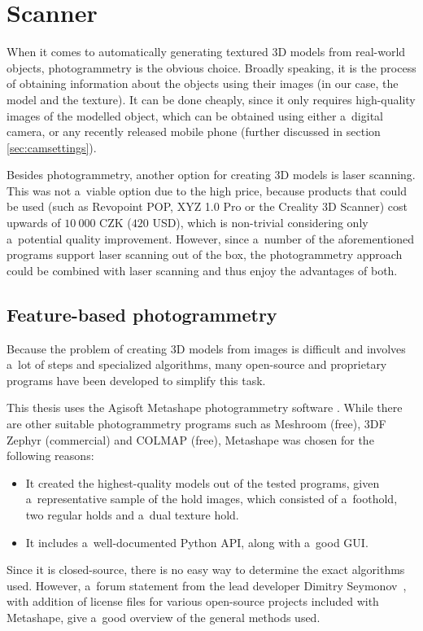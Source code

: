 \chapter{Scanner}\label{sec:scanner}
When it comes to automatically generating textured 3D models from real-world objects, photogrammetry is the obvious choice.
Broadly speaking, it is the process of obtaining information about the objects using their images (in our case, the model and the texture).
It can be done cheaply, since it only requires high-quality images of the modelled object, which can be obtained using either a~digital camera, or any recently released mobile phone (further discussed in section \ref{sec:camsettings}).

Besides photogrammetry, another option for creating 3D models is laser scanning.
This was not a~viable option due to the high price, because products that could be used (such as Revopoint POP, XYZ 1.0 Pro or the Creality 3D Scanner) cost upwards of $10\ 000$ CZK ($420$ USD), which is non-trivial considering only a~potential quality improvement.
However, since a~number of the aforementioned programs support laser scanning out of the box, the photogrammetry approach could be combined with laser scanning and thus enjoy the advantages of both.

\section{Feature-based photogrammetry}
Because the problem of creating 3D models from images is difficult and involves a~lot of steps and specialized algorithms, many open-source and proprietary programs have been developed to simplify this task.

This thesis uses the Agisoft Metashape photogrammetry software \cite{metashape}.
While there are other suitable photogrammetry programs such as Meshroom (free), 3DF Zephyr (commercial) and COLMAP (free), Metashape was chosen for the following reasons:
\begin{itemize}
	\item It created the highest-quality models out of the tested programs, given a~representative sample of the hold images, which consisted of a~foothold, two regular holds and a~dual texture hold.
	\item It includes a~well-documented Python API, along with a~good GUI.
\end{itemize}

Since it is closed-source, there is no easy way to determine the exact algorithms used.
However, a~forum statement from the lead developer Dimitry Seymonov~\cite{metashapeForumPost}, with addition of license files for various open-source projects included with Metashape, give a~good overview of the general methods used.

